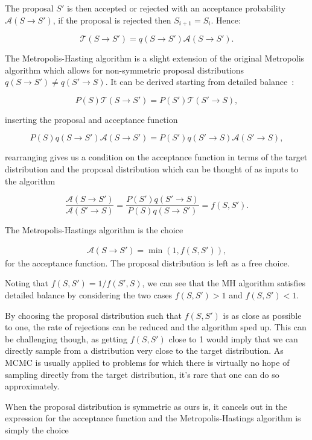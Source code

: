 The proposal \(S'\) is then accepted or rejected with an acceptance probability \(\mathcal{A}(S \to S')\), if the proposal is rejected then \(S_{i+1} = S_{i}\). Hence:

\[\mathcal{T}(S\to S') = q(S\to S')\mathcal{A}(S \to S').\]

The Metropolis-Hasting algorithm is a slight extension of the original Metropolis algorithm which allows for non-symmetric proposal distributions \(q(S\to S') \neq q(S'\to S)\). It can be derived starting from detailed balance~\autocite{krauthIntroductionMonteCarlo1998}:

\[
P(S)\mathcal{T}(S \to S') = P(S')\mathcal{T}(S' \to S),
\]

inserting the proposal and acceptance function

\[
P(S)q(S \to S')\mathcal{A}(S \to S') = P(S')q(S' \to S)\mathcal{A}(S' \to S),
\]

rearranging gives us a condition on the acceptance function in terms of the target distribution and the proposal distribution which can be thought of as inputs to the algorithm

\[
\frac{\mathcal{A}(S \to S')}{\mathcal{A}(S' \to S)} = \frac{P(S')q(S' \to S)}{P(S)q(S \to S')} = f(S, S').
\]

The Metropolis-Hastings algorithm is the choice

\[
\begin{aligned}
\label{eq:mh} 
\mathcal{A}(S \to S') = \min\left(1, f(S,S')\right),
\end{aligned}
\] for the acceptance function. The proposal distribution is left as a free choice.

Noting that \(f(S,S') = 1/f(S',S)\), we can see that the MH algorithm satisfies detailed balance by considering the two cases \(f(S,S') > 1\) and \(f(S,S') < 1\).

By choosing the proposal distribution such that \(f(S,S')\) is as close as possible to one, the rate of rejections can be reduced and the algorithm sped up. This can be challenging though, as getting \(f(S,S')\) close to 1 would imply that we can directly sample from a distribution very close to the target distribution. As MCMC is usually applied to problems for which there is virtually no hope of sampling directly from the target distribution, it's rare that one can do so approximately.

When the proposal distribution is symmetric as ours is, it cancels out in the expression for the acceptance function and the Metropolis-Hastings algorithm is simply the choice

